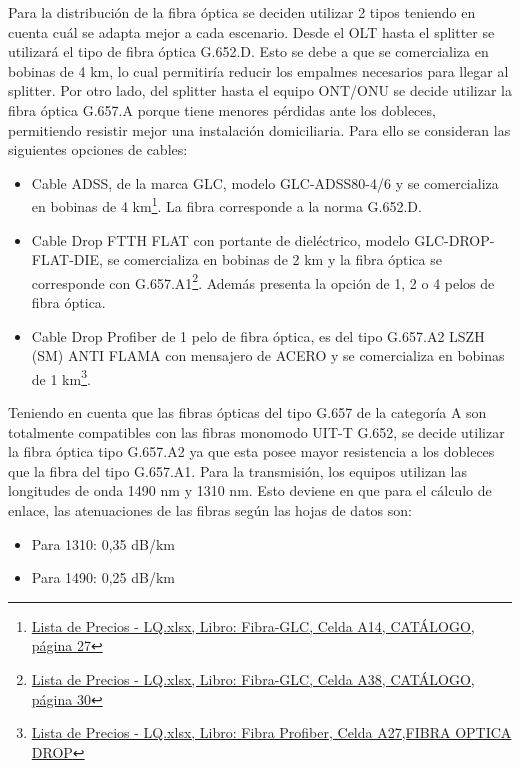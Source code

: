 \documentclass[11pt,a4paper]{article}
\begin{document}
Para la distribución de la fibra óptica se deciden utilizar 2 tipos teniendo en cuenta cuál se adapta mejor a cada escenario. 
Desde el OLT hasta el splitter se utilizará el tipo de fibra óptica G.652.D. 
Esto se debe a que se comercializa en bobinas de 4 km, lo cual permitiría reducir los empalmes necesarios para llegar al splitter. 
Por otro lado, del splitter hasta el equipo ONT/ONU se decide utilizar la fibra óptica G.657.A porque tiene menores pérdidas ante los dobleces, permitiendo resistir mejor una instalación domiciliaria. 
Para ello se consideran las siguientes opciones de cables:

\begin{itemize}
\item  Cable ADSS, de la marca GLC, modelo GLC-ADSS80-4/6 y se comercializa en bobinas de 4 km\footnote{\href{https://docs.google.com/spreadsheets/d/1rmlMl8y5O11057Wbb303iKk9dc6XedijkpFMKAgwH_U/edit\#gid=400833791}{Lista de Precios - LQ.xlsx, Libro: Fibra-GLC, Celda A14, CATÁLOGO, página 27}}. La fibra corresponde a la norma G.652.D.
\item  Cable Drop FTTH FLAT con portante de dieléctrico, modelo GLC-DROP-FLAT-DIE, se comercializa en bobinas de 2 km y la fibra óptica se corresponde con G.657.A1\footnote{\href{https://docs.google.com/spreadsheets/d/1rmlMl8y5O11057Wbb303iKk9dc6XedijkpFMKAgwH_U/edit\#gid=400833791}{Lista de Precios - LQ.xlsx, Libro: Fibra-GLC, Celda A38, CATÁLOGO, página 30}}. Además presenta la opción de 1, 2 o 4 pelos de fibra óptica.
\item  Cable Drop Profiber de 1 pelo de fibra óptica, es del tipo G.657.A2 LSZH (SM) ANTI FLAMA con mensajero de ACERO y se comercializa en bobinas de 1 km\footnote{\href{https://docs.google.com/spreadsheets/d/1rmlMl8y5O11057Wbb303iKk9dc6XedijkpFMKAgwH_U/edit\#gid=400833791}{Lista de Precios - LQ.xlsx, Libro: Fibra Profiber, Celda A27,FIBRA OPTICA DROP}}. 
\end{itemize}

Teniendo en cuenta que las fibras ópticas del tipo G.657 de la categoría A son totalmente compatibles con las fibras monomodo UIT-T G.652, se decide utilizar la fibra óptica tipo G.657.A2 ya que esta posee mayor resistencia a los dobleces que la fibra del tipo G.657.A1. 
Para la transmisión, los equipos utilizan las longitudes de onda 1490 nm y 1310 nm. 
Esto deviene en que para el cálculo de enlace, las atenuaciones de las fibras según las hojas de datos son: 

\begin{itemize}
\item  Para 1310: 0,35 dB/km
\item  Para 1490: 0,25 dB/km 
\end{itemize}
\end{document}
